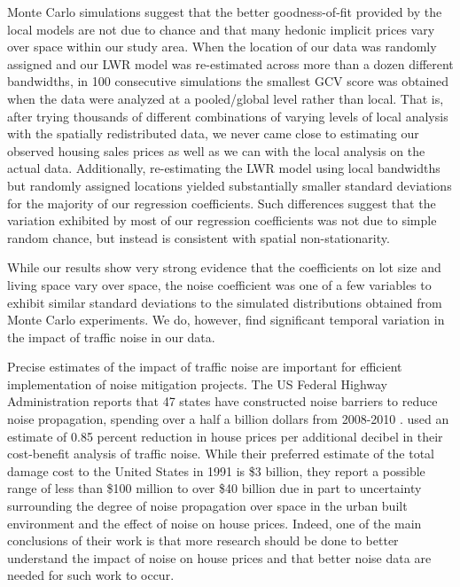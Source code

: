 \documentclass{article}\usepackage{graphicx, color}
\begin{document}
Monte Carlo simulations suggest that the better goodness-of-fit provided by the local models are not due to chance and that many hedonic implicit prices vary over space within our study area. When the location of our data was randomly assigned and our LWR model was re-estimated across more than a dozen different bandwidths, in 100 consecutive simulations the smallest GCV score was obtained when the data were analyzed at a pooled/global level rather than local. That is, after trying thousands of different combinations of varying levels of local analysis with the spatially redistributed data, we never came close to estimating our observed housing sales prices as well as we can with the local analysis on the actual data. Additionally, re-estimating the LWR model using local bandwidths but randomly assigned locations yielded substantially smaller standard deviations for the majority of our regression coefficients. Such differences suggest that the variation exhibited by most of our regression coefficients was not due to simple random chance, but instead is consistent with spatial non-stationarity. 

While our results show very strong evidence that the coefficients on lot size and living space vary over space, the noise coefficient was one of a few variables to exhibit similar standard deviations to the simulated distributions obtained from Monte Carlo experiments. We do, however, find significant temporal variation in the impact of traffic noise in our data.

Precise estimates of the impact of traffic noise are important for efficient implementation of noise mitigation projects. The US Federal Highway Administration reports that 47 states have constructed noise barriers to reduce noise propagation, spending over a half a billion dollars from 2008-2010 . \citet{Delucchi1998} used an estimate of 0.85 percent reduction in house prices per additional decibel in their cost-benefit analysis of traffic noise. While their preferred estimate of the total damage cost to the United States in 1991 is \$3 billion, they report a possible range of less than \$100 million to over \$40 billion due in part to uncertainty surrounding the degree of noise propagation over space in the urban built environment and the effect of noise on house prices. Indeed, one of the main conclusions of their work is that more research should be done to better understand the impact of noise on house prices and that better noise data are needed for such work to occur. 
\end{document}
